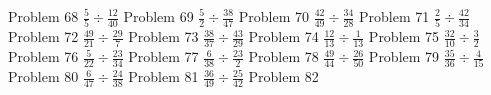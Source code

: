 \documentclass{article}
\begin{document}
Problem 68
\newline
\hfill \break
$\displaystyle \frac{5}{5} \div \frac{12}{40}$
\newline
\hfill \break
Problem 69
\newline
\hfill \break
$\displaystyle \frac{5}{2} \div \frac{38}{47}$
\newline
\hfill \break
Problem 70
\newline
\hfill \break
$\displaystyle \frac{42}{49} \div \frac{34}{28}$
\newline
\hfill \break
Problem 71
\newline
\hfill \break
$\displaystyle \frac{2}{5} \div \frac{42}{34}$
\newline
\hfill \break
Problem 72
\newline
\hfill \break
$\displaystyle \frac{49}{21} \div \frac{29}{7}$
\newline
\hfill \break
Problem 73
\newline
\hfill \break
$\displaystyle \frac{38}{37} \div \frac{43}{29}$
\newline
\hfill \break
Problem 74
\newline
\hfill \break
$\displaystyle \frac{12}{13} \div \frac{1}{13}$
\newline
\hfill \break
Problem 75
\newline
\hfill \break
$\displaystyle \frac{32}{10} \div \frac{3}{2}$
\newline
\hfill \break
Problem 76
\newline
\hfill \break
$\displaystyle \frac{5}{22} \div \frac{23}{34}$
\newline
\hfill \break
Problem 77
\newline
\hfill \break
$\displaystyle \frac{6}{38} \div \frac{23}{2}$
\newline
\hfill \break
Problem 78
\newline
\hfill \break
$\displaystyle \frac{49}{44} \div \frac{26}{50}$
\newline
\hfill \break
Problem 79
\newline
\hfill \break
$\displaystyle \frac{35}{36} \div \frac{4}{15}$
\newline
\hfill \break
Problem 80
\newline
\hfill \break
$\displaystyle \frac{6}{47} \div \frac{24}{38}$
\newline
\hfill \break
Problem 81
\newline
\hfill \break
$\displaystyle \frac{36}{49} \div \frac{25}{42}$
\newline
\hfill \break
Problem 82
\end{document}
